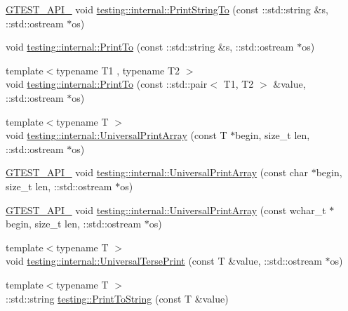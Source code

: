 \begin{DoxyCompactItemize}
\item 
\mbox{\hyperlink{gtest-port_8h_aa73be6f0ba4a7456180a94904ce17790}{G\+T\+E\+S\+T\+\_\+\+A\+P\+I\+\_\+}} void \mbox{\hyperlink{namespacetesting_1_1internal_a8b53e46cea3f8bdfc9342057c4f6ba62}{testing\+::internal\+::\+Print\+String\+To}} (const \+::std\+::string \&s, \+::std\+::ostream $\ast$os)
\item 
void \mbox{\hyperlink{namespacetesting_1_1internal_af59b4f5d83276cd807c45063b14bad44}{testing\+::internal\+::\+Print\+To}} (const \+::std\+::string \&s, \+::std\+::ostream $\ast$os)
\item 
{\footnotesize template$<$typename T1 , typename T2 $>$ }\\void \mbox{\hyperlink{namespacetesting_1_1internal_af2c33928facbf2edf7af564278724d98}{testing\+::internal\+::\+Print\+To}} (const \+::std\+::pair$<$ T1, T2 $>$ \&value, \+::std\+::ostream $\ast$os)
\item 
{\footnotesize template$<$typename T $>$ }\\void \mbox{\hyperlink{namespacetesting_1_1internal_ad79d71c3110f8eb24ab352d68f29436a}{testing\+::internal\+::\+Universal\+Print\+Array}} (const T $\ast$begin, size\+\_\+t len, \+::std\+::ostream $\ast$os)
\item 
\mbox{\hyperlink{gtest-port_8h_aa73be6f0ba4a7456180a94904ce17790}{G\+T\+E\+S\+T\+\_\+\+A\+P\+I\+\_\+}} void \mbox{\hyperlink{namespacetesting_1_1internal_a72c997dbd2c562110b2cb56c359decfa}{testing\+::internal\+::\+Universal\+Print\+Array}} (const char $\ast$begin, size\+\_\+t len, \+::std\+::ostream $\ast$os)
\item 
\mbox{\hyperlink{gtest-port_8h_aa73be6f0ba4a7456180a94904ce17790}{G\+T\+E\+S\+T\+\_\+\+A\+P\+I\+\_\+}} void \mbox{\hyperlink{namespacetesting_1_1internal_ae31e146c35fd75afc6a9cc73ae2692d1}{testing\+::internal\+::\+Universal\+Print\+Array}} (const wchar\+\_\+t $\ast$begin, size\+\_\+t len, \+::std\+::ostream $\ast$os)
\item 
{\footnotesize template$<$typename T $>$ }\\void \mbox{\hyperlink{namespacetesting_1_1internal_afa92f5a284929dc3723e654a25feb7b9}{testing\+::internal\+::\+Universal\+Terse\+Print}} (const T \&value, \+::std\+::ostream $\ast$os)
\item 
{\footnotesize template$<$typename T $>$ }\\\+::std\+::string \mbox{\hyperlink{namespacetesting_aa5717bb1144edd1d262d310ba70c82ed}{testing\+::\+Print\+To\+String}} (const T \&value)
\end{DoxyCompactItemize}

